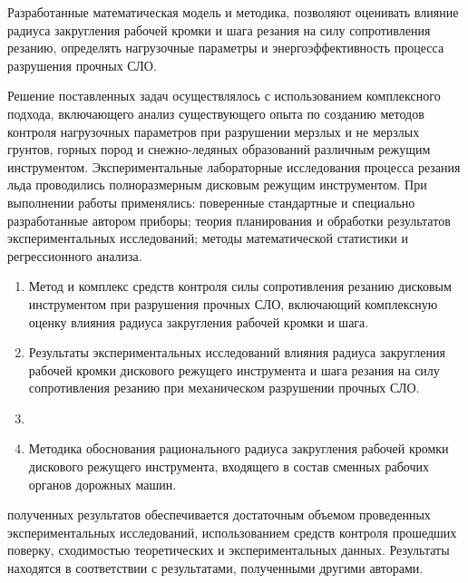 {\influence} Разработанные математическая модель и методика, позволяют оценивать влияние радиуса закругления рабочей кромки и шага резания на силу сопротивления резанию, определять нагрузочные параметры и энергоэффективность процесса разрушения прочных СЛО.

{\methods} Решение поставленных задач осуществлялось с использованием комплексного подхода, включающего анализ существующего опыта по созданию методов контроля нагрузочных параметров при разрушении мерзлых и не мерзлых грунтов, горных пород и снежно-ледяных образований различным режущим инструментом. Экспериментальные лабораторные исследования процесса резания льда проводились полноразмерным дисковым режущим инструментом. При выполнении работы применялись: поверенные стандартные и специально разработанные автором приборы; теория планирования и обработки результатов экспериментальных исследований; методы математической статистики и регрессионного анализа.

{}
\begin{enumerate}
  \item Метод и комплекс средств контроля силы сопротивления резанию дисковым инструментом при разрушения прочных СЛО, включающий комплексную оценку влияния радиуса закругления рабочей кромки и шага.
  \item Результаты экспериментальных исследований влияния радиуса закругления рабочей кромки дискового режущего инструмента и шага резания на силу сопротивления резанию при механическом разрушении прочных СЛО.
  \item {}
  \item Методика обоснования рационального радиуса закругления рабочей кромки дискового режущего инструмента, входящего в состав сменных рабочих органов дорожных машин.
\end{enumerate}

{\reliability} полученных результатов обеспечивается достаточным объемом проведенных экспериментальных исследований, использованием средств контроля прошедших поверку, сходимостью теоретических и экспериментальных данных. Результаты находятся в соответствии с результатами, полученными другими авторами.


